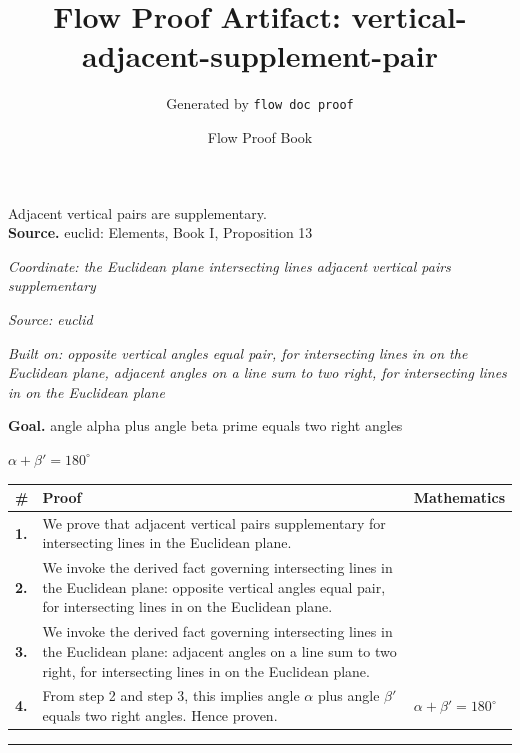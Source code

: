 \documentclass[11pt]{article}
\title{Flow Proof Artifact: vertical-adjacent-supplement-pair}
\author{Generated by \texttt{flow doc proof}}
\date{Flow Proof Book}
\theoremstyle{definition}
\begin{document}
\maketitle
Adjacent vertical pairs are supplementary.\\[0.5em]
\textbf{Source.} euclid: Elements, Book I, Proposition 13\\[0.5em]
\bigskip
{}\par
\smallskip\noindent\textit{Coordinate: the Euclidean plane \cdot intersecting lines \cdot adjacent vertical pairs supplementary}\par
\smallskip\noindent\textit{Source: euclid}\par
\smallskip\noindent\textit{Built on: opposite vertical angles equal pair, for intersecting lines in on the Euclidean plane, adjacent angles on a line sum to two right, for intersecting lines in on the Euclidean plane}\par
\medskip
\noindent\textbf{Goal.} angle alpha plus angle beta prime equals two right angles\par
\noindent$\displaystyle \alpha + \beta' = 180^\circ$\par
\medskip
\noindent
\begin{tabular}{@{} >{\raggedright\arraybackslash}p{} >{\raggedright\arraybackslash}p{} >{\raggedleft\arraybackslash}p{} @{}}
\textbf{\#} & \textbf{Proof} & \textbf{Mathematics} \\
\midrule
\textbf{1.} & We prove that adjacent vertical pairs supplementary for intersecting lines in the Euclidean plane. & \\[0.45em]
\textbf{2.} & We invoke the derived fact governing intersecting lines in the Euclidean plane: opposite vertical angles equal pair, for intersecting lines in on the Euclidean plane. & \\[0.45em]
\textbf{3.} & We invoke the derived fact governing intersecting lines in the Euclidean plane: adjacent angles on a line sum to two right, for intersecting lines in on the Euclidean plane. & \\[0.45em]
\textbf{4.} & From step 2 and step 3, this implies angle $\alpha$ plus angle $\beta$$'$ equals two right angles. Hence proven. & $\displaystyle \alpha + \beta' = 180^\circ$ \\[0.45em]
\bottomrule
\end{tabular}
\label{thm:Geometry-intersecting lines-adjacent_vertical_pairs_supplementary}
\par\medskip\hrule
\end{document}
